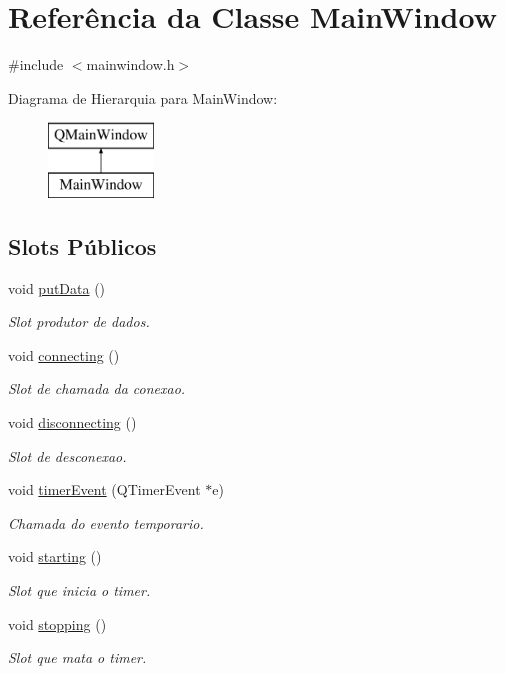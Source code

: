 \hypertarget{class_main_window}{}\section{Referência da Classe Main\+Window}
\label{class_main_window}


{\ttfamily \#include $<$mainwindow.\+h$>$}

Diagrama de Hierarquia para Main\+Window\+:\begin{figure}[H]
\begin{center}
\leavevmode
\includegraphics[height=2.000000cm]{class_main_window}
\end{center}
\end{figure}
\subsection*{Slots Públicos}
\begin{DoxyCompactItemize}
\item 
void \hyperlink{class_main_window_afdfeb13ec363b0eb8ecacaf0aa13b605}{put\+Data} ()
\begin{DoxyCompactList}\small\item\em Slot produtor de dados. \end{DoxyCompactList}\item 
void \hyperlink{class_main_window_afd17285381f6457c552f26f359f8f968}{connecting} ()
\begin{DoxyCompactList}\small\item\em Slot de chamada da conexao. \end{DoxyCompactList}\item 
void \hyperlink{class_main_window_a496a126baa8c2a0a7d0bdab86c128f98}{disconnecting} ()
\begin{DoxyCompactList}\small\item\em Slot de desconexao. \end{DoxyCompactList}\item 
void \hyperlink{class_main_window_a9d08a694a5f9c532225754381b8011ea}{timer\+Event} (Q\+Timer\+Event $\ast$e)
\begin{DoxyCompactList}\small\item\em Chamada do evento temporario. \end{DoxyCompactList}\item 
void \hyperlink{class_main_window_a756fd5832a55713567189c43d8aa27ca}{starting} ()
\begin{DoxyCompactList}\small\item\em Slot que inicia o timer. \end{DoxyCompactList}\item 
void \hyperlink{class_main_window_a6ba0902dc1552226ae4a7866a42efee0}{stopping} ()
\begin{DoxyCompactList}\small\item\em Slot que mata o timer. \end{DoxyCompactList}\end{DoxyCompactItemize}
